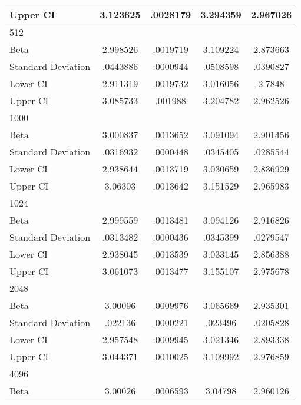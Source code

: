 {\begin{tabular}{l*{1}{cccc}}
Upper CI            &    3.123625&    .0028179&    3.294359&    2.967026\\
\hline
512                 &            &            &            &            \\
Beta                &    2.998526&    .0019719&    3.109224&    2.873663\\
Standard Deviation  &    .0443886&    .0000944&    .0508598&    .0390827\\
Lower CI            &    2.911319&    .0019732&    3.016056&      2.7848\\
Upper CI            &    3.085733&     .001988&    3.204782&    2.962526\\
\hline
1000                &            &            &            &            \\
Beta                &    3.000837&    .0013652&    3.091094&    2.901456\\
Standard Deviation  &    .0316932&    .0000448&    .0345405&    .0285544\\
Lower CI            &    2.938644&    .0013719&    3.030659&    2.836929\\
Upper CI            &     3.06303&    .0013642&    3.151529&    2.965983\\
\hline
1024                &            &            &            &            \\
Beta                &    2.999559&    .0013481&    3.094126&    2.916826\\
Standard Deviation  &    .0313482&    .0000436&    .0345399&    .0279547\\
Lower CI            &    2.938045&    .0013539&    3.033145&    2.856388\\
Upper CI            &    3.061073&    .0013477&    3.155107&    2.975678\\
\hline
2048                &            &            &            &            \\
Beta                &     3.00096&    .0009976&    3.065669&    2.935301\\
Standard Deviation  &     .022136&    .0000221&     .023496&    .0205828\\
Lower CI            &    2.957548&    .0009945&    3.021346&    2.893338\\
Upper CI            &    3.044371&    .0010025&    3.109992&    2.976859\\
\hline
4096                &            &            &            &            \\
Beta                &     3.00026&    .0006593&     3.04798&    2.960126\\

\end{tabular}}
